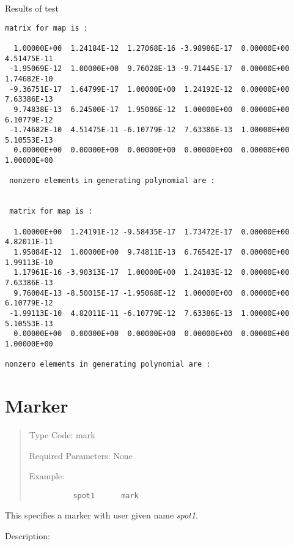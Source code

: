 Results of test
\begin{footnotesize}
\begin{verbatim}
matrix for map is :

  1.00000E+00  1.24184E-12  1.27068E-16 -3.98986E-17  0.00000E+00  4.51475E-11
 -1.95069E-12  1.00000E+00  9.76028E-13 -9.71445E-17  0.00000E+00  1.74682E-10
 -9.36751E-17  1.64799E-17  1.00000E+00  1.24192E-12  0.00000E+00  7.63386E-13
  9.74838E-13  6.24500E-17  1.95086E-12  1.00000E+00  0.00000E+00  6.10779E-12
 -1.74682E-10  4.51475E-11 -6.10779E-12  7.63386E-13  1.00000E+00  5.10553E-13
  0.00000E+00  0.00000E+00  0.00000E+00  0.00000E+00  0.00000E+00  1.00000E+00

 nonzero elements in generating polynomial are :


 matrix for map is :

  1.00000E+00  1.24191E-12 -9.58435E-17  1.73472E-17  0.00000E+00  4.82011E-11
  1.95084E-12  1.00000E+00  9.74811E-13  6.76542E-17  0.00000E+00  1.99113E-10
  1.17961E-16 -3.90313E-17  1.00000E+00  1.24183E-12  0.00000E+00  7.63386E-13
  9.76004E-13 -8.50015E-17 -1.95068E-12  1.00000E+00  0.00000E+00  6.10779E-12
 -1.99113E-10  4.82011E-11 -6.10779E-12  7.63386E-13  1.00000E+00  5.10553E-13
  0.00000E+00  0.00000E+00  0.00000E+00  0.00000E+00  0.00000E+00  1.00000E+00

nonzero elements in generating polynomial are :

\end{verbatim}
\end{footnotesize}

\newpage




\section{Marker}
\begin{quotation}
\noindent Type Code:  mark
\vspace{5mm}

\noindent Required Parameters:  None

\vspace{5mm}
\noindent Example:
\begin{verbatim}
          spot1      mark
\end{verbatim}
\end{quotation}
This specifies a marker with user given name {\em spot1}.

\vspace{5mm}
     Description:
\vspace{2mm}

